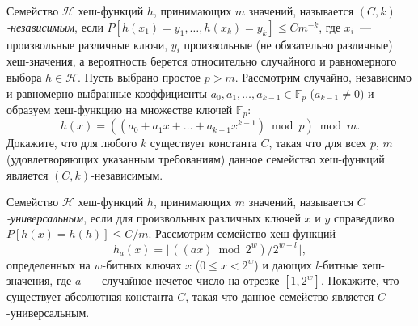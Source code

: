 \documentclass[11pt]{article}
\renewcommand{\le}{\leqslant}   %
\begin{document}
\begin{problem}{20}
Семейство $\mathcal{H}$ хеш-функций $h$, принимающих $m$ значений, называется \emph{$(C,k)$-независимым}, если $P[h(x_1)=y_1, \ldots, h(x_k) = y_k] \le Cm^{-k}$,
где $x_i$~--- произвольные различные ключи, $y_i$ произвольные (не обязательно различные) хеш-значения, а вероятность берется относительно случайного и равномерного выбора $h \in \mathcal{H}$.
Пусть выбрано простое $p > m$. Рассмотрим случайно, независимо и равномерно выбранные коэффициенты $a_0, a_1, \ldots, a_{k-1} \in \mathbb{F}_p$ ($a_{k-1} \ne 0$) и образуем хеш-функцию
на множестве ключей $\mathbb{F}_p$:
$$
    h(x) = ((a_0 + a_1 x + \ldots + a_{k-1} x^{k-1}) \bmod p) \bmod m.
$$
Докажите, что для любого $k$ существует константа $C$, такая что для всех $p$, $m$ (удовлетворяющих указанным требованиям) данное семейство хеш-функций является $(C,k)$-независимым.
\end{problem}

\begin{problem}{30}
Семейство $\mathcal{H}$ хеш-функций $h$, принимающих $m$ значений, называется \emph{$C$-универсальным}, если для произвольных различных ключей $x$ и $y$ справедливо $P[h(x)=h(h)] \le C/m$.
Рассмотрим семейство хеш-функций
$$
    h_{a}(x) = \lfloor \left( (ax) \bmod 2^w \right) / 2^{w-l}\rfloor,
$$
определенных на $w$-битных ключах $x$ ($0 \le x < 2^w$) и дающих $l$-битные хеш-значения,
где $a$~--- случайное нечетое число на отрезке $[1,2^w]$.
Покажите, что существует абсолютная константа $C$, такая что данное семейство является $C$-универсальным.
\end{problem}
\end{document}
